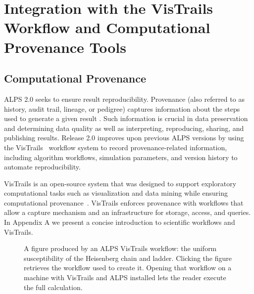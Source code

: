 \documentclass[12pt]{iopart}
\begin{document}

\section{Integration with the VisTrails Workflow and Computational Provenance Tools}

\subsection{Computational Provenance}

ALPS 2.0 seeks to ensure result reproducibility. Provenance (also
referred to as history, audit trail, lineage, or pedigree) captures
information about the steps used to generate a given result
\cite{Silva07,Freire08}. Such information is crucial in data
preservation and determining data quality as well as interpreting,
reproducing, sharing, and publishing results. Release 2.0 improves
upon previous ALPS versions by using the VisTrails~\cite{vistrails}
workflow system to record provenance-related information, including
algorithm workflows, simulation parameters, and version history to automate
reproducibility.

VisTrails is an open-source system that was designed to support
exploratory computational tasks such as visualization and data mining
while ensuring computational provenance~\cite{vistrails,Bavoil05}.
VisTrails enforces provenance with workflows that allow a capture
mechanism and an infrastructure for storage, access, and queries. In Appendix A we present a concise introduction to scientific workflows and VisTrails.

\begin{figure}
\begin{center}

\caption{A figure produced by an ALPS VisTrails workflow: the uniform susceptibility of the Heisenberg chain and ladder. Clicking the figure retrieves the workflow used to 
create it. Opening that workflow on a machine with VisTrails and ALPS installed lets the reader execute the full calculation.}
\label{fig:figure}
\end{center}
\end{figure}
\end{document}
